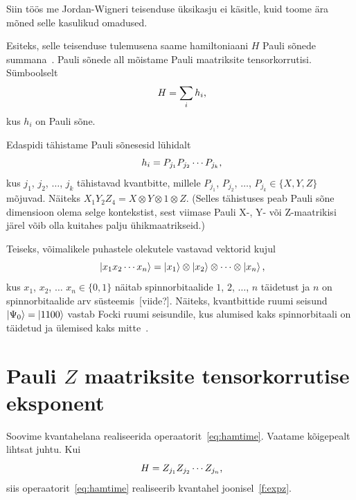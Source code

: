 \documentclass[12pt]{report}
\def\ket#1{\mathinner{|#1\rangle}}
\begin{document}
Siin töös me Jordan-Wigneri teisenduse üksikasju ei käsitle, kuid toome ära mõned selle kasulikud omadused.

Esiteks, selle teisenduse tulemusena saame hamiltoniaani \(H\) Pauli sõnede summana~\cite{whitfield+etal}.
Pauli sõnede all mõistame Pauli maatriksite tensorkorrutisi.
Sümboolselt
\begin{equation}\label{eq:paulisum} H = \sum_i h_i\rlap{,} \end{equation}
kus $h_i$ on Pauli sõne.

Edaspidi tähistame Pauli sõnesesid lühidalt
\begin{equation} h_i=P_{j_1}P_{j_2}\cdots P_{j_k} \rlap{,}\end{equation}
kus \(j_1\), \(j_2\), $\ldots$, \(j_k\) tähistavad kvantbitte, millele \(P_{j_1}\), \(P_{j_2}\), \(\ldots\), \(P_{j_k}\in\{X,Y,Z\}\) mõjuvad.
Näiteks \(X_1Y_2Z_4=X\otimes Y\otimes 1\otimes Z.\)
(Selles tähistuses peab Pauli sõne dimensioon olema selge kontekstist, sest viimase Pauli X-, Y- või Z-maatrikisi järel võib olla kuitahes palju ühikmaatrikseid.)

Teiseks, võimalikele puhastele olekutele vastavad vektorid kujul
\begin{equation}
  \ket{x_1x_2\cdots x_n}
     = \ket{x_1}\otimes\ket{x_2}\otimes\cdots\otimes\ket{x_n}\rlap{,}
\end{equation}
kus $x_1$, $x_2$, $\ldots$ $x_n\in\{0,1\}$ näitab spinnorbitaalide $1$, $2$, $\ldots$, $n$ täidetust ja $n$ on spinnorbitaalide arv süsteemis~[viide?].
Näiteks, kvantbittide ruumi seisund \(\ket{\Psi_0}=\ket{1100}\) vastab Focki ruumi seisundile, kus alumised kaks spinnorbitaali on täidetud ja ülemised kaks mitte~\cite{szabo+ostlund, mcardle+etal}.

\section{Pauli \(Z\) maatriksite tensorkorrutise eksponent}

Soovime kvantahelana realiseerida operaatorit~\ref{eq:hamtime}.
Vaatame kõigepealt lihtsat juhtu.
Kui
\begin{equation}
  H=Z_{j_1}Z_{j_2}\cdots Z_{j_n}\rlap{,}
\end{equation}
siis operaatorit~\ref{eq:hamtime} realiseerib kvantahel joonisel~\ref{f:expz}.
\end{document}
